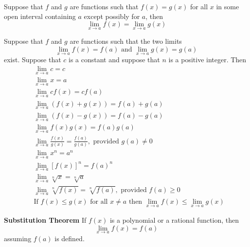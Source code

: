 \begin{mythm} Suppose that $f$ and $g$ are functions such that $f(x)=g(x)$ for all $x$ in some open interval containing $a$ except possibly for $a$, then
\[
\lim_{x\rightarrow a} f(x) = \lim_{x\rightarrow a} g(x)
\]
\end{mythm}

\begin{mythm} Suppose that $f$ and $g$ are functions such that the two limits
\[
\lim_{x\rightarrow a} f(x) = f(a) \textrm{ and } \lim_{x\rightarrow a} g(x) = g(a)
\]
exist.  Suppose that $c$ is a constant and suppose that $n$ is a positive integer.  Then
\begin{align}
&\lim_{x\rightarrow a} c = c\\
&\lim_{x\rightarrow a} x = a\\
&\lim_{x\rightarrow a} c f(x) = c  f(a)\\
&\lim_{x\rightarrow a} (f(x)+g(x)) = f(a)+g(a)\\
&\lim_{x\rightarrow a} (f(x)-g(x)) = f(a)-g(a)\\
&\lim_{x\rightarrow a} f(x) g(x) = f(a) g(a)\\
&\lim_{x\rightarrow a} \frac{f(x)}{g(x)} = \frac{f(a)}{g(a)}, \textrm{ provided }g(a) \ne 0\\
&\lim_{x\rightarrow a} x^n = a^n\\
&\lim_{x\rightarrow a} [f(x)]^n = f(a)^n\\
&\lim_{x\rightarrow a} \sqrt[n]{x} = \sqrt[n]{a}\\
&\lim_{x\rightarrow a} \sqrt[n]{f(x)} = \sqrt[n]{f(a)}, \textrm{ provided } f(a) \ge 0 \\
&\textrm{If } f(x) \le g(x) \textrm{ for all } x \ne a \textrm{ then }\lim_{x\rightarrow a} f(x) \le  \lim_{x\rightarrow a} g(x)
\end{align}
\end{mythm}

\begin{mythm} \textbf{Substitution Theorem}
If $f(x)$ is a polynomial or a rational function, then
\[
\lim_{x\rightarrow a} f(x) = f(a)
\]
assuming $f(a)$ is defined.
\end{mythm}
